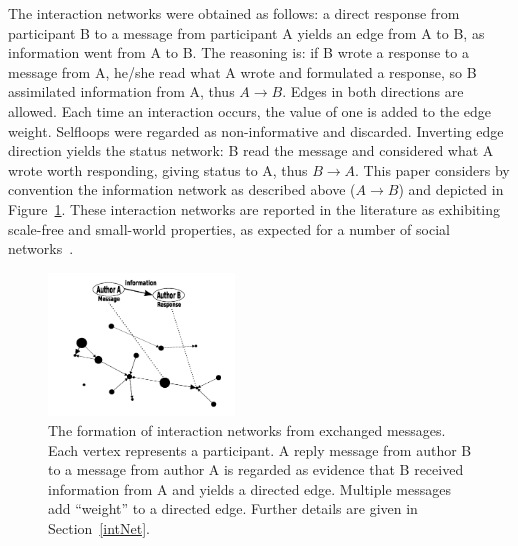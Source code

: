 \documentclass[%
	aip,
	jmp,%
	amsmath,amssymb,
	reprint,%
]{revtex4-1}
\begin{document}
The interaction networks were obtained as follows:
a direct response from participant B to a message from participant A yields an edge from A to B, as information went from A to B.
The reasoning is: if B wrote a response to a message from A,
he/she read what A wrote and formulated a response, so B assimilated information from A, thus $A \rightarrow B$.
Edges in both directions are allowed.
Each time an interaction occurs, the value of one is added to the edge weight.
Selfloops were regarded as non-informative and discarded.
Inverting edge direction yields the status network:
B read the message and considered what A wrote worth responding, giving status to A,
thus $B\rightarrow A$.
This paper considers by convention the information network as described above ($A\rightarrow B$) and depicted in Figure~\ref{formationNetwork}.
These interaction networks are reported in the literature
as exhibiting scale-free and small-world properties,
as expected for a number of social networks~\cite{bird,newmanBook}.

\begin{figure}[!h]
	\centering
	\includegraphics[width=0.44\textwidth]{figs/criaRede2_}
	\caption{The formation of interaction networks from exchanged messages.
	Each vertex represents a participant.
	A reply message from author B to a message from author A is regarded as evidence
	that B received information from A and yields a directed edge.
	Multiple messages add ``weight'' to a directed edge.
	Further details are given in Section~\ref{intNet}.}
	\label{formationNetwork}
\end{figure}

\end{document}
